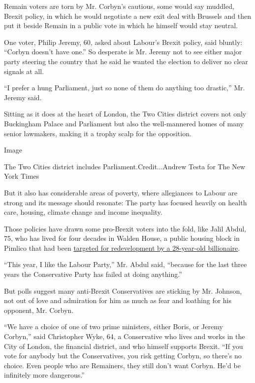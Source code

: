 Remain voters are torn by Mr. Corbyn's cautious, some would say muddled,
Brexit policy, in which he would negotiate a new exit deal with Brussels
and then put it beside Remain in a public vote in which he himself would
stay neutral.

One voter, Philip Jeremy, 60, asked about Labour's Brexit policy, said
bluntly: ``Corbyn doesn't have one.'' So desperate is Mr. Jeremy not to
see either major party steering the country that he said he wanted the
election to deliver no clear signals at all.

``I prefer a hung Parliament, just so none of them do anything too
drastic,'' Mr. Jeremy said.

Sitting as it does at the heart of London, the Two Cities district
covers not only Buckingham Palace and Parliament but also the
well-mannered homes of many senior lawmakers, making it a trophy scalp
for the opposition.

Image

The Two Cities district includes Parliament.Credit...Andrew Testa for
The New York Times

But it also has considerable areas of poverty, where allegiances to
Labour are strong and its message should resonate: The party has focused
heavily on health care, housing, climate change and income inequality.

Those policies have drawn some pro-Brexit voters into the fold, like
Jalil Abdul, 75, who has lived for four decades in Walden House, a
public housing block in Pimlico that had been
\href{https://www.mirror.co.uk/news/uk-news/council-tenants-win-fight-billionaire-20064135}{targeted
for redevelopment by a 28-year-old billionaire}.

``This year, I like the Labour Party,'' Mr. Abdul said, ``because for
the last three years the Conservative Party has failed at doing
anything.''

But polls suggest many anti-Brexit Conservatives are sticking by Mr.
Johnson, not out of love and admiration for him as much as fear and
loathing for his opponent, Mr. Corbyn.

``We have a choice of one of two prime ministers, either Boris, or
Jeremy Corbyn,'' said Christopher Wyke, 64, a Conservative who lives and
works in the City of London, the financial district, and who himself
supports Brexit. ``If you vote for anybody but the Conservatives, you
risk getting Corbyn, so there's no choice. Even people who are
Remainers, they still don't want Corbyn. He'd be infinitely more
dangerous.''


